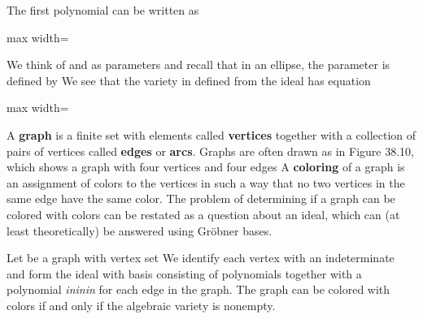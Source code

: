 \documentclass[11pt,oneside]{article}
\begin{document}
\BookNarrativetrue

\begin{BookBody}

\noindent The first polynomial can be written as

\begin{center}\begin{adjustbox}{max width=\linewidth}\end{adjustbox}\end{center}

\noindent We think of  and  as parameters and recall that in an ellipse, the parameter  is defined by  We see that the variety in  defined from the ideal   has equation

\begin{center}\begin{adjustbox}{max width=\linewidth}\end{adjustbox}\end{center} \BookEnd{\blacktriangle}

A\textbf{ graph} is a finite set with elements called\textbf{ vertices} together with a collection of pairs of vertices called\textbf{ edges} or\textbf{ arcs}. Graphs are often drawn as in Figure 38.10, which shows a graph with four vertices  and four edges   A\textbf{ coloring} of a graph is an assignment of colors to the vertices in such a way that no two vertices in the same edge have the same color. The problem of determining if a graph can be colored with  colors can be restated as a question about an ideal, which can (at least theoretically) be answered using Gröbner bases.

 Let  be a graph with vertex set  We identify each vertex with an indeterminate and form the ideal  with basis consisting of polynomials  together with a polynomial \textit{in}\textit{in}\textit{in}  for each edge in the graph. The graph  can be colored with  colors if and only if the algebraic variety  is nonempty.


\end{BookBody}
\end{document}
